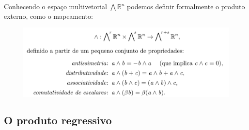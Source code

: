 \documentclass[10pt]{beamer}
\theoremstyle{plain}
\theoremstyle{definition}
\begin{document}
	\begin{frame}
		Conhecendo o espaço multivetorial $\bigwedge\mathbb{R}^n$ podemos definir formalmente o produto externo, como o mapeamento:
		\begin{figure}[H]
			\includegraphics[width=0.9\linewidth]{figures/externalProduct.png}
		\end{figure}
	\end{frame}

	\subsection{O produto regressivo}
	
\end{document}
